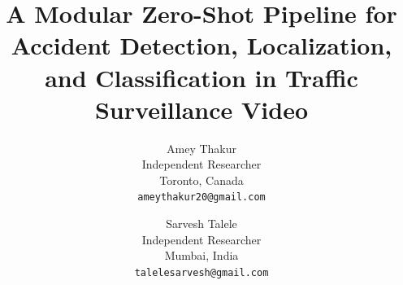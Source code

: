 \documentclass[10pt,twocolumn,letterpaper]{article}
\title{A Modular Zero-Shot Pipeline for Accident Detection, Localization, and Classification in Traffic Surveillance Video}
\author{Amey Thakur\\
Independent Researcher\\
Toronto, Canada\\
{\tt\small ameythakur20@gmail.com}
\and
Sarvesh Talele\\
Independent Researcher\\
Mumbai, India\\
{\tt\small talelesarvesh@gmail.com}
}
\begin{document}
\maketitle





{
    \small
    
    
}
\end{document}

